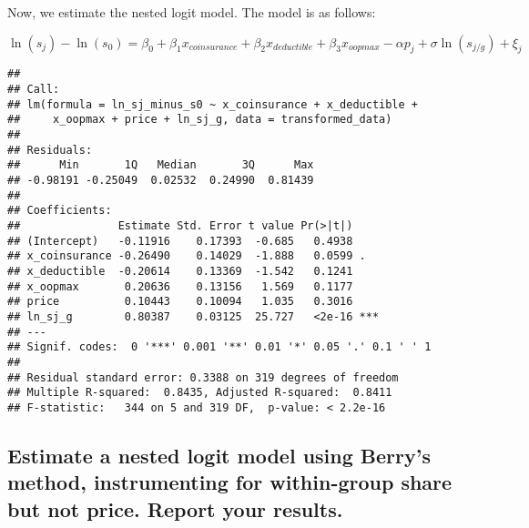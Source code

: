 \documentclass[]{article}
\newenvironment{Shaded}{\begin{snugshade}}{\end{snugshade}}
\newcommand{\DataTypeTok}[1]{\textcolor[rgb]{0.13,0.29,0.53}{#1}}
\newcommand{\DecValTok}[1]{\textcolor[rgb]{0.00,0.00,0.81}{#1}}
\newcommand{\KeywordTok}[1]{\textcolor[rgb]{0.13,0.29,0.53}{\textbf{#1}}}
\newcommand{\NormalTok}[1]{#1}
\newcommand{\OperatorTok}[1]{\textcolor[rgb]{0.81,0.36,0.00}{\textbf{#1}}}
\newcommand{\StringTok}[1]{\textcolor[rgb]{0.31,0.60,0.02}{#1}}
\begin{document}
Now, we estimate the nested logit model. The model is as follows:

\[
\ln(s_j) - \ln(s_0) = \beta_0 + \beta_1 x_{coinsurance} + \beta_2 x_{deductible} + \beta_3 x_{oopmax} - \alpha p_j + \sigma \ln(s_{j/g}) + \xi_j
\]

\begin{Shaded}
\end{Shaded}

\begin{verbatim}
## 
## Call:
## lm(formula = ln_sj_minus_s0 ~ x_coinsurance + x_deductible + 
##     x_oopmax + price + ln_sj_g, data = transformed_data)
## 
## Residuals:
##      Min       1Q   Median       3Q      Max 
## -0.98191 -0.25049  0.02532  0.24990  0.81439 
## 
## Coefficients:
##               Estimate Std. Error t value Pr(>|t|)    
## (Intercept)   -0.11916    0.17393  -0.685   0.4938    
## x_coinsurance -0.26490    0.14029  -1.888   0.0599 .  
## x_deductible  -0.20614    0.13369  -1.542   0.1241    
## x_oopmax       0.20636    0.13156   1.569   0.1177    
## price          0.10443    0.10094   1.035   0.3016    
## ln_sj_g        0.80387    0.03125  25.727   <2e-16 ***
## ---
## Signif. codes:  0 '***' 0.001 '**' 0.01 '*' 0.05 '.' 0.1 ' ' 1
## 
## Residual standard error: 0.3388 on 319 degrees of freedom
## Multiple R-squared:  0.8435, Adjusted R-squared:  0.8411 
## F-statistic:   344 on 5 and 319 DF,  p-value: < 2.2e-16
\end{verbatim}

\hypertarget{estimate-a-nested-logit-model-using-berrys-method-instrumenting-for-within-group-share-but-not-price.-report-your-results.}{%
\subsection{Estimate a nested logit model using Berry's method,
instrumenting for within-group share but not price. Report your
results.}\label{estimate-a-nested-logit-model-using-berrys-method-instrumenting-for-within-group-share-but-not-price.-report-your-results.}}
\end{document}
